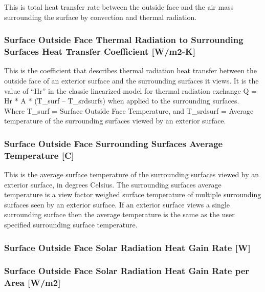 This is total heat transfer rate between the outside face and the air mass surrounding the surface by convection and thermal radiation.

\subsubsection{Surface Outside Face Thermal Radiation to Surrounding Surfaces Heat Transfer Coefficient {[}W/m2-K{]}}\label{surface-outside-face-thermal-radiation-to-surrounding-surfaces-heat-transfer-coefficient-wm2-k}

This is the coefficient that describes thermal radiation heat transfer between the outside face of an exterior surface and the surrounding surfaces it views. It is the value of ``Hr'' in the classic linearized model for thermal radiation exchange Q = Hr * A * (T\_surf -- T\_srdsurfs) when applied to the surrounding surfaces. Where T\_surf = Surface Outside Face Temperature, and T\_srdsurf = Average temperature of the surrounding surfaces viewed by an exterior surface.

\subsubsection{Surface Outside Face Surrounding Surfaces Average Temperature {[}C{]}}\label{surface-outside-face-surrounding-surfaces-average-temperature-C}

This is the average surface temperature of the surrounding surfaces viewed by an exterior surface, in degrees Celsius. The surrounding surfaces average temperature is a view factor weighed surface temperature of multiple surrounding surfaces seen by an exterior surface. If an exterior surface views a single surrounding surface then the average temperature is the same as the user specified surrounding surface temperature.

\subsubsection{Surface Outside Face Solar Radiation Heat Gain Rate {[}W{]}}\label{surface-outside-face-solar-radiation-heat-gain-rate-w}

\subsubsection{Surface Outside Face Solar Radiation Heat Gain Rate per Area {[}W/m2{]}}\label{surface-outside-face-solar-radiation-heat-gain-rate-per-area-wm2}

